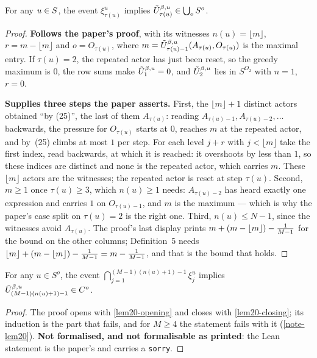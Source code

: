 \begin{lemma}
  \label{lem19}
  \leanok
  For any $u \in S$, the event $\xi^u_{\tau(u)}$ implies
  $\tilde{U}^{\beta,u}_{\tau(u)} \in \bigcup_{o} S^o$.
\end{lemma}
\begin{proof}
  \leanok
  \textbf{Follows the paper's proof}, with its witnesses $n(u) = \lfloor m
  \rfloor$, $r = m - \lfloor m \rfloor$ and $o = O_{\tau(u)}$, where $m =
  \tilde{U}^{\beta,u}_{\tau(u)-1}(A_{\tau(u)}, O_{\tau(u)})$ is the maximal entry.  If
  $\tau(u) = 2$, the repeated actor has just been reset, so the greedy maximum
  is $0$, the row sums make $\tilde{U}^{\beta,u}_1 = 0$, and $\tilde{U}^{\beta,u}_2$ lies in
  $S^{O_2}$ with $n = 1$, $r = 0$.

  \textbf{Supplies three steps the paper asserts.}  First, the $\lfloor m
  \rfloor + 1$ distinct actors obtained ``by (25)'', the last of them
  $A_{\tau(u)}$: reading $A_{\tau(u)-1}, A_{\tau(u)-2}, \dots$ backwards, the
  pressure for $O_{\tau(u)}$ starts at $0$, reaches $m$ at the repeated actor,
  and by~(25) climbs at most $1$ per step.  For each level $j + r$ with $j <
  \lfloor m \rfloor$ take the first index, read backwards, at which it is
  reached: it overshoots by less than $1$, so these indices are distinct and none
  is the repeated actor, which carries $m$.  These $\lfloor m \rfloor$ actors are
  the witnesses; the repeated actor is reset at step $\tau(u)$.  Second, $m \ge 1$ once $\tau(u) \ge 3$, which $n(u) \ge
  1$ needs: $A_{\tau(u)-2}$ has heard exactly one expression and carries $1$ on
  $O_{\tau(u)-1}$, and $m$ is the maximum --- which is why the paper's case split
  on $\tau(u) = 2$ is the right one.  Third, $n(u) \le N - 1$, since the
  witnesses avoid $A_{\tau(u)}$.  The proof's last display prints $m + (m -
  \lfloor m \rfloor) - \tfrac{1}{M-1}$ for the bound on the other columns;
  Definition~5 needs $\lfloor m \rfloor + (m - \lfloor m \rfloor) - \tfrac{1}{M-1} =
  m - \tfrac{1}{M-1}$, and that is the bound that holds.
\end{proof}

\begin{lemma}
  \label{lem20}
  \leanok
  For any $u \in S^o$, the event $\bigcap_{j=1}^{(M-1)(n(u)+1)-1} \xi_j^u$
  implies $\tilde{U}^{\beta,u}_{(M-1)(n(u)+1)-1} \in C^o$.
\end{lemma}
\begin{proof}
  The proof opens with \ref{lem20-opening} and closes with \ref{lem20-closing};
  its induction is the part that fails, and for $M \ge 4$ the statement fails
  with it (\ref{note-lem20}).  \textbf{Not formalised, and not formalisable as
  printed}: the Lean statement is the paper's and carries a \texttt{sorry}.
\end{proof}

